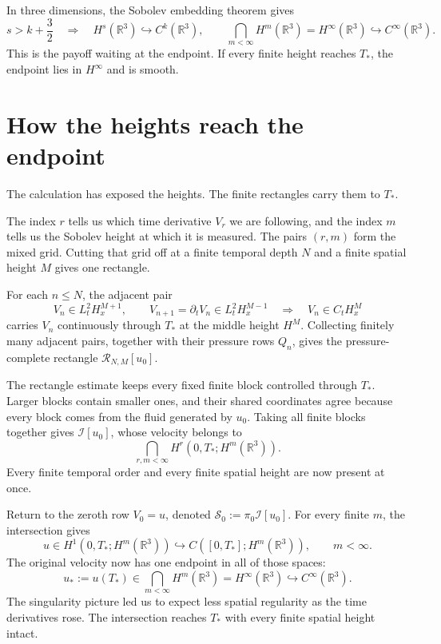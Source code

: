 \documentclass[12pt]{article}
\newcommand{\R}{\mathbb R}
\newcommand{\I}{\mathcal I}
\begin{document}
In three dimensions, the Sobolev embedding theorem gives
\[
  s>k+\frac32
  \quad\Longrightarrow\quad
  H^s(\R^3)\hookrightarrow C^k(\R^3),
  \qquad
  \bigcap_{m<\infty}H^m(\R^3)
  =
  H^\infty(\R^3)
  \hookrightarrow
  C^\infty(\R^3).
\]
This is the payoff waiting at the endpoint. If every finite height reaches
\(T_*\), the endpoint lies in \(H^\infty\) and is smooth.

\section*{How the heights reach the endpoint}

The calculation has exposed the heights. The finite rectangles carry them to
\(T_*\).

The index \(r\) tells us which time derivative \(V_r\) we are following, and
the index \(m\) tells us the Sobolev height at which it is measured. The pairs
\((r,m)\) form the mixed grid. Cutting that grid off at a finite temporal depth
\(N\) and a finite spatial height \(M\) gives one rectangle.

For each \(n\leq N\), the adjacent pair
\[
  V_n\in L_t^2H_x^{M+1},
  \qquad
  V_{n+1}=\partial_tV_n\in L_t^2H_x^{M-1}
  \quad\Longrightarrow\quad
  V_n\in C_tH_x^M
\]
carries \(V_n\) continuously through \(T_*\) at the middle height \(H^M\).
Collecting finitely many adjacent pairs, together with their pressure rows
\(Q_n\), gives the pressure-complete rectangle \(\mathcal R_{N,M}[u_0]\).

The rectangle estimate keeps every fixed finite block controlled through
\(T_*\). Larger blocks contain smaller ones, and their shared coordinates agree
because every block comes from the fluid generated by \(u_0\). Taking all
finite blocks together gives \(\I[u_0]\), whose velocity belongs to
\[
  \bigcap_{r,m<\infty}
  H^r(0,T_*;H^m(\R^3)).
\]
Every finite temporal order and every finite spatial height are now present at
once.

Return to the zeroth row \(V_0=u\), denoted
\(\mathscr S_0:=\pi_0\I[u_0]\). For every finite \(m\), the intersection gives
\[
  u\in H^1(0,T_*;H^m(\R^3))
  \hookrightarrow
  C([0,T_*];H^m(\R^3)),
  \qquad m<\infty.
\]
The original velocity now has one endpoint in all of those spaces:
\[
  u_*:=u(T_*)
  \in
  \bigcap_{m<\infty}H^m(\R^3)
  =
  H^\infty(\R^3)
  \hookrightarrow
  C^\infty(\R^3).
\]
The singularity picture led us to expect less spatial regularity as the time
derivatives rose. The intersection reaches \(T_*\) with every finite spatial
height intact.
\end{document}
